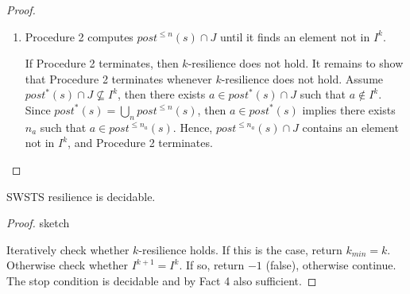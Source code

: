 \begin{proof}
\begin{enumerate}
\item Procedure 2 computes
 $post^{\leq n}(s) \cap J$
 until it finds an element not in $ I^k$.

If Procedure 2 terminates, then
$k$-resilience does not hold.
It remains to show that Procedure 2 terminates whenever $k$-resilience does not hold.
Assume $ post^*(s) \cap J \not\subseteq I^k$, then there exists $a \in post^*(s) \cap J$ such that $a \not\in I^k$. Since $post^*(s) = \bigcup_{n} post^{\leq n}(s)$, then 
$a \in post^*(s)$
implies
there exists
$n_a$
such that
$a \in post^{\leq n_a}(s)$.
Hence,  $post^{\leq n_a}(s) \cap J$ contains an element not in 
$I^k$,
and Procedure 2 terminates.
\end{enumerate}





\end{proof}



\begin{theorem}
{\sc SWSTS resilience} is decidable.
\end{theorem}

\begin{proof}{sketch}

Iteratively check whether $k$-resilience holds. 
If this is the case, return $k_{min} = k$. Otherwise check whether 
$I^{k+1} = I^k$. If so, return $-1$ (false), otherwise
continue.
The stop condition is decidable
and by Fact 4 also sufficient. 
\end{proof}

